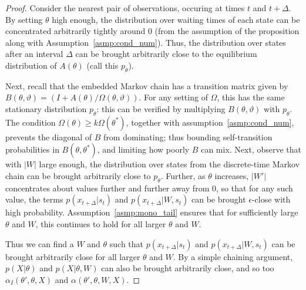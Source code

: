 \begin{proof}
  Consider the nearest pair of observations, occuring at times $t$ and 
  $t + \Delta$. %
  By setting $\theta$ high enough, the distribution over waiting times 
  of each state can be concentrated arbitrarily tightly around
  $0$ (from the assumption of the proposition along with 
  Assumption~\ref{asmp:cond_num}). Thus, the distribution over states after an 
  interval $\Delta$ can be brought arbitrarily close to the equilibrium 
  distribution of $A(\theta)$  (call this $p_{\theta}$).

  Next, recall that the embedded Markov chain has a transition matrix 
  given by $B(\theta,\vartheta) = (I + A(\theta)/\Omega(\theta,\vartheta))$. 
  For any setting of $\Omega$, this has the same stationary distribution 
  $p_{\theta}$: this can be verified by multiplying $B(\theta,\vartheta)$ with 
  $p_\theta$.
  The condition $\Omega(\theta) \ge k\Omega(\theta^*)$, together with 
  assumption~\ref{asmp:cond_num}, prevents the
  diagonal of $B$ from dominating; thus bounding self-transition 
  probabilities in $B(\theta,\theta^*)$, and limiting how poorly $B$ can mix.
  Next, observe that with $|W|$ large enough, the distribution over states from 
  the discrete-time Markov chain can be brought arbitrarily close to 
  $p_{\theta}$. Further, as $\theta$ increases, $|W'|$ concentrates about
  values further and further away from $0$, so that
 for any such value, the terms $p(x_{t+\Delta}|s_t)$ and 
 $p(x_{t+\Delta}|W,s_t)$ can be brought $\epsilon$-close with high
 probability.  Assumption~\ref{asmp:mono_tail} ensures that
  for sufficiently large $\theta$ and $W$, this continues to hold for
  all larger $\theta$ and $W$. 
 
  Thus we can find a $W$ and $\theta$ such that $p(x_{t+\Delta}|s_t)$ and 
  $p(x_{t+\Delta}|W,s_t)$ can be brought arbitrarily close for all larger
  $\theta$ and $W$.  By a simple chaining argument, $p(X|\theta)$ and 
  $p(X|\theta,W)$ can also be brought arbitrarily close, and
  so too $\alpha_I(\theta',\theta,X)$ and $\alpha(\theta',\theta,W,X)$.
\end{proof}

